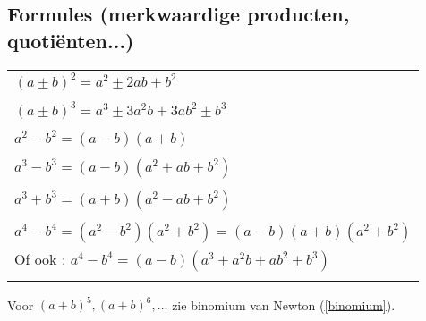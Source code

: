 \subsection{Formules (merkwaardige producten, quoti\"enten...)} \label{formules}
\hypertarget{formules}{}
\begin{tabular}{l}
$(a\pm b)^2 = a^2\pm 2ab +b^2$\\\\
$(a\pm b)^3 = a^3\pm 3a^2b +3ab^2\pm b^3$\\\\
$a^2-b^2 = (a-b)(a+b)$\\\\
$a^3-b^3 = (a-b)(a^2+ab+b^2)$\\\\
$a^3+b^3 = (a+b)(a^2-ab+b^2)$\\\\
$a^4-b^4 = (a^2-b^2)(a^2+b^2)=(a-b)(a+b)(a^2+b^2)$\\
Of ook : $a^4-b^4=(a-b)(a^3+a^2b+ab^2+b^3)$\\\\
\end{tabular} \newline
Voor $(a+b)^5, (a+b)^6,\ldots$ zie binomium van Newton (\ref{binomium}).

